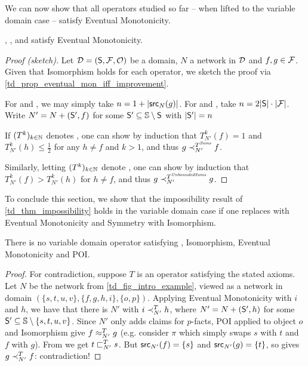We can now show that all operators studied so far -- when lifted to the
variable domain case -- satisfy Eventual Monotonicity.

\begin{theorem}
    \label{td_thm_operators_satisfy_eventual_mon}
    \voting{}, \sums{}, \scvoting{} and \usums{} satisfy Eventual Monotonicity.
\end{theorem}

\begin{proof}[Proof (sketch)]
    Let $\D = (\S, \F, \O)$ be a domain, $N$ a network in $\D$ and $f, g \in
    \F$. Given that Isomorphism holds for each operator, we sketch the proof
    via \cref{td_prop_eventual_mon_iff_improvement}.

    For \voting{} and \scvoting{}, we may simply take $n = 1 + |\src_N(g)|$.
    For \sums{} and \usums{}, take $n = 2 |\S| \cdot |\F|$. Write $N' = N +
    (\S', f)$ for some $\S' \subseteq \uS \setminus \S$ with $|\S'| = n$

    If $(T^k)_{k \in \Nat}$ denotes \sums{}, one can show by induction that
    $T^k_{N'}(f) = 1$ and $T^{k}_{N'}(h) \le \frac{1}{2}$ for any $h \ne f$ and
    $k > 1$, and thus $g \flt_{N'}^{T^\sums{}} f$.

    Similarly, letting $(T^k)_{k \in \Nat}$ denote \usums{}, one can show by
    induction that $T^{k}_{N'}(f) > T^{k}_{N'}(h)$ for $h \ne f$, and thus $g
    \flt_{N'}^{T^\usums{}} g$.
\end{proof}

To conclude this section, we show that the impossibility result of
\cref{td_thm_impossibility} holds in the variable domain case if one replaces
\monotonicity{} with Eventual Monotonicity and Symmetry with Isomorphism.

\begin{theorem}
\label{td_thm_var_dom_impossibility}
    There is no variable domain operator satisfying \coherence{}, Isomorphism,
    Eventual Monotonicity and POI.
\end{theorem}

\begin{proof}
    For contradiction, suppose $T$ is an operator satisfying the stated axioms.
    Let $N$ be the network from \cref{td_fig_intro_example}, viewed as a network
    in domain $(\{s, t, u, v\}, \{f, g, h, i\}, \{o, p\})$. Applying Eventual
    Monotonicity with $i$ and $h$, we have that there is $N'$ with $i
    \flt_{N'}^T h$, where $N' = N + (\S', h)$ for some $\S' \subseteq \uS
    \setminus \{s, t, u, v\}$. Since $N'$ only adds claims for $p$-facts, POI
    applied to object $o$ and Isomorphism give $f \feq_{N'}^T g$ (e.g. consider
    $\pi$ which simply swaps $s$ with $t$ and $f$ with $g$). From
    \sourcecoherence{} we get $t \slt_{N'}^T s$. But $\src_{N'}(f) = \{s\}$ and
    $\src_{N'}(g) = \{t\}$, so \factcoherence{} gives $g \flt_{N'}^T f$:
    contradiction!
\end{proof}

